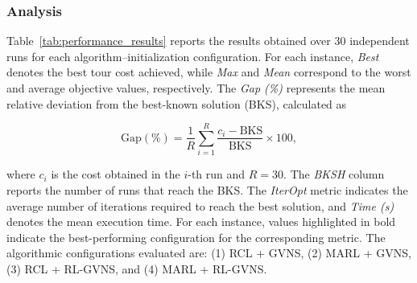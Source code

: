 \documentclass[runningheads]{llncs}
\begin{document}
\subsubsection{Analysis}
\label{subsubsec:results_analysis}

Table~\ref{tab:performance_results} reports the results obtained over 30 independent runs for each algorithm--initialization configuration. For each instance, \emph{Best} denotes the best tour cost achieved, while \emph{Max} and \emph{Mean} correspond to the worst and average objective values, respectively. The \emph{Gap (\%)} represents the mean relative deviation from the best-known solution (BKS), calculated as

\begin{equation}
\text{Gap}(\%) = \frac{1}{R} \sum_{i=1}^{R}
\frac{c_i - \text{BKS}}{\text{BKS}} \times 100,
\end{equation}

\noindent where \(c_i\) is the cost obtained in the \(i\)-th run and \(R=30\). The \emph{BKSH} column reports the number of runs that reach the BKS. The \emph{IterOpt} metric indicates the average number of iterations required to reach the best solution, and \emph{Time (s)} denotes the mean execution time. For each instance, values highlighted in bold indicate the best-performing configuration for the corresponding metric. The algorithmic configurations evaluated are: (1) RCL + GVNS, (2) MARL + GVNS, (3) RCL + RL-GVNS, and (4) MARL + RL-GVNS.
\end{document}
